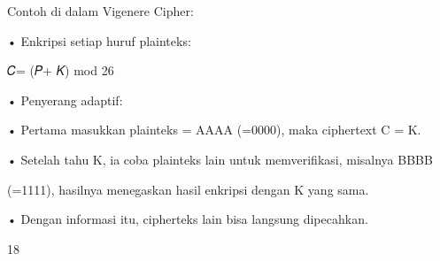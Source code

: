 \documentclass{article}
\begin{document}

Contoh di dalam Vigenere Cipher:

• Enkripsi setiap huruf plainteks:

           𝐶= (𝑃+ 𝐾) mod 26

• Penyerang adaptif:

• Pertama masukkan plainteks = AAAA (=0000), maka ciphertext C = K.

• Setelah tahu K, ia coba plainteks lain untuk memverifikasi, misalnya BBBB 

(=1111), hasilnya menegaskan hasil enkripsi dengan K yang sama.

• Dengan informasi itu, cipherteks lain bisa langsung dipecahkan.


18
\end{document}

